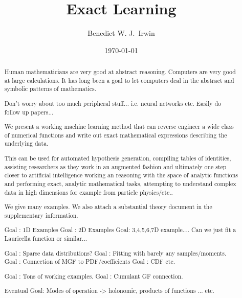 \documentclass{article}
\title{Exact Learning}
\date{\today}
\begin{document}
%

\author[1]{Benedict W. J.~Irwin}


\maketitle

\begin{abstract}
Human mathematicians are very good at abstract reasoning. Computers are very good at large calculations. It has long been a goal to let computers deal in the abstract and symbolic patterns of mathematics.

Don't worry about too much peripheral stuff... i.e. neural networks etc. Easily do follow up papers...


We present a working machine learning method that can reverse engineer a wide class of numerical functions and write out exact mathematical expressions describing the underlying data.

This can be used for automated hypothesis generation, compiling tables of identities, assisting researchers as they work in an augmented fashion and ultimately one step closer to artificial intelligence working an reasoning with the space of analytic functions and performing exact, analytic mathematical tasks, attempting to understand complex data in high dimensions for example from particle physics/etc..

We give many examples.
We also attach a substantial theory document in the supplementary information.

Goal : 1D Examples
Goal : 2D Examples
Goal:   3,4,5,6,7D example.... Can we just fit a Lauricella function or similar...


Goal : Sparse data distributions?
Goal : Fitting with barely any samples/moments.
Goal : Connection of MGF to PDF/coefficients
Goal : CDF etc.

Goal : Tons of working examples.
Goal : Cumulant GF connection.

Eventual Goal: Modes of operation -> holonomic, products of functions ... etc.

\end{abstract}

\end{document}
